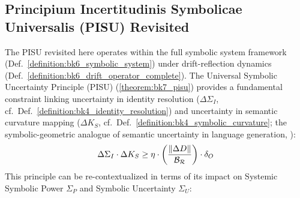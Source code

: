 \subsection{Principium Incertitudinis Symbolicae Universalis (PISU) Revisited}
\label{subsec:bk7_pisu_revisited_power_uncertainty}

The PISU revisited here operates within the full symbolic system framework (Def.~\ref{definition:bk6_symbolic_system}) under drift-reflection dynamics (Def.~\ref{definition:bk6_drift_operator_complete}).
The Universal Symbolic Uncertainty Principle (PISU) (\ref{theorem:bk7_pisu}) provides a fundamental constraint linking uncertainty in identity resolution (\(\Delta\Sigma_I\), cf.~Def.~\ref{definition:bk4_identity_resolution}) and uncertainty in semantic curvature mapping (\(\Delta K_S\), cf.~Def.~\ref{definition:bk4_symbolic_curvature}; the symbolic-geometric analogue of semantic uncertainty in language generation, \citealp{kuhn2023semantic}):
\[
\Delta\Sigma_I \cdot \Delta K_S \geq \eta \cdot \left(\frac{\|\Delta D\|}{\mathcal{B_R}}\right) \cdot \delta_O
\]
This principle can be re-contextualized in terms of its impact on Systemic Symbolic Power \(\Sigma_P\) and Symbolic Uncertainty \(\Sigma_U\):
